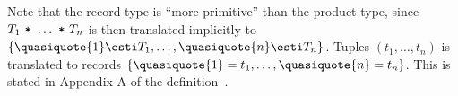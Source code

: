 \begin{node}[Remark]\label{sml-000J}%
Note that the record type is ``more primitive'' than the product type,
since $T_{1}\mbox{ \texttt{*} }\dots\mbox{ \texttt{*} }T_{n}$ is then
translated implicitly to
$\{\quasiquote{1}\esti T_{1},\dots,\quasiquote{n}\esti T_{n}\}$.
Tuples $(t_{1},\dots,t_{n})$ is translated to records
$\{\quasiquote{1}=t_{1},\dots,\quasiquote{n}=t_{n}\}$.
This is stated in Appendix A of the definition~\cite{milner1997definition}.
\end{node}
